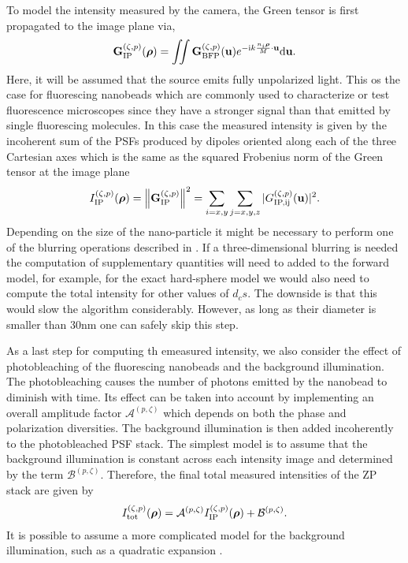 \documentclass[reprint,aps,pra,superscriptaddress,
amsmath,amssymb]{revtex4-1}
\begin{document}
To model the intensity measured by the camera, the Green tensor is first 
propagated to the image plane via,
\begin{align}
\textbf G^{(\zeta ,p)}_\text{IP} (\boldsymbol \rho ) = \iint \textbf G^{(\zeta ,p)}_\text{BFP} (\textbf u)  e^{ - \text{i} k  \frac{n_i \boldsymbol \rho}{M}  \cdot \textbf u } \mathrm{d} \textbf u .
\end{align}
Here, it will be assumed that the source emits fully unpolarized light. This 
os the case for fluorescing nanobeads which are commonly used to characterize or test 
fluorescence microscopes since they have a stronger signal than that emitted 
by single fluorescing molecules. In this case the measured intensity is 
given by the incoherent sum of the PSFs produced by dipoles oriented along 
each of the three Cartesian axes which is the same as the squared Frobenius 
norm of the Green tensor at the image plane 
\begin{align}
I^{(\zeta ,p)}_\text{IP} (\boldsymbol \rho ) = \left\lVert\textbf G^{(\zeta ,p)}_\text{IP} \right\rVert^2 
= \sum_{i=x,y} \sum_{j=x,y,z} |G^{(\zeta ,p)}_\text{IP,ij}( \textbf u)|^2.
\end{align}
Depending on the size of the nano-particle it might be necessary to perform 
one of the blurring operations described in \cite{}. If a three-dimensional 
blurring is needed the computation of supplementary quantities will need to 
added to the forward model, for example, for the exact hard-sphere model 
we would also need to compute the total intensity for other values of $d_cs$.
The downside is that this would slow the algorithm considerably. 
However, as long as their 
diameter is smaller than 30nm one can safely skip this step.

As a last step for computing th emeasured intensity, we also consider 
the effect of photobleaching of the fluorescing nanobeads and the background 
illumination. The photobleaching causes the number of photons emitted by the 
nanobead to diminish with time. Its effect can be taken into account by 
implementing an overall amplitude factor $\mathcal{A}^{(p,\zeta)}$
which depends on both the phase and polarization diversities. The background 
illumination is then added incoherently to the photobleached PSF stack. 
The simplest model is to assume that the background illumination is constant 
across each intensity image and determined by the term 
$\mathcal{B}^{(p,\zeta)}$. Therefore, the final total measured intensities 
of the ZP stack are given by 
\begin{align}
I^{(\zeta ,p)}_\text{tot} (\boldsymbol \rho )  =  \mathcal{A}^{(p,\zeta)} I^{(\zeta ,p)}_\text{IP} (\boldsymbol \rho ) + \mathcal{B}^{(p,\zeta)}.
\end{align}
It is possible to assume a more complicated model for the background 
illumination, such as a quadratic expansion \cite{aristov2018zola}. 
\end{document}
